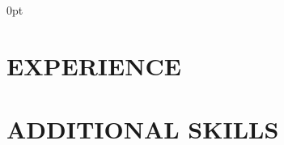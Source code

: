 \documentclass[letterpaper]{../../deedy-resume}
\begin{document}
{\filcenter\Large\normalfont\sffamily\color{white}}
{}
{0pt}
{
	{
		\color{gold}
	}
}
\begin{minipage}[t]{0.59\textwidth} 
	\vspace*{-1em}\section{EXPERIENCE} 
	\section{ADDITIONAL SKILLS} 
\end{minipage} 

\end{document}
